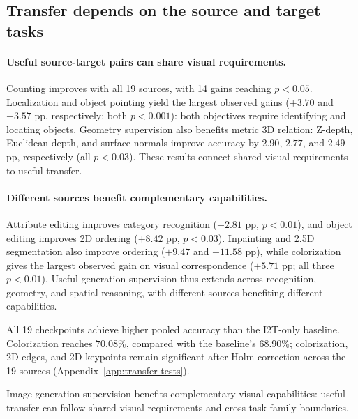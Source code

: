 \subsection{Transfer depends on the source and target tasks}
\paragraph{Useful source-target pairs can share visual requirements.}
Counting improves with all 19 sources, with 14 gains reaching $p<0.05$. Localization and object pointing yield the largest observed gains ($+3.70$ and $+3.57$ pp, respectively; both $p<0.001$): both objectives require identifying and locating objects. Geometry supervision also benefits metric 3D relation: Z-depth, Euclidean depth, and surface normals improve accuracy by $2.90$, $2.77$, and $2.49$ pp, respectively (all $p<0.03$). These results connect shared visual requirements to useful transfer.

\paragraph{Different sources benefit complementary capabilities.}
Attribute editing improves category recognition ($+2.81$ pp, $p<0.01$), and object editing improves 2D ordering ($+8.42$ pp, $p<0.03$). Inpainting and 2.5D segmentation also improve ordering ($+9.47$ and $+11.58$ pp), while colorization gives the largest observed gain on visual correspondence ($+5.71$ pp; all three $p<0.01$). Useful generation supervision thus extends across recognition, geometry, and spatial reasoning, with different sources benefiting different capabilities.

All 19 checkpoints achieve higher pooled accuracy than the I2T-only baseline. Colorization reaches $70.08\%$, compared with the baseline's $68.90\%$; colorization, 2D edges, and 2D keypoints remain significant after Holm correction across the 19 sources (Appendix~\ref{app:transfer-tests}).

\begin{findingbox}
Image-generation supervision benefits complementary visual capabilities: useful transfer can follow shared visual requirements and cross task-family boundaries.
\end{findingbox}
